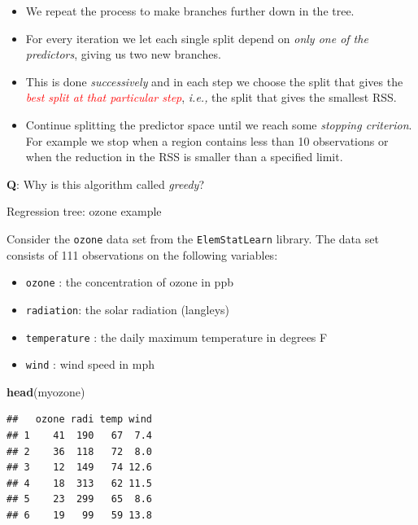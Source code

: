 \documentclass[10pt,ignorenonframetext,]{beamer}
\newenvironment{Shaded}{\begin{snugshade}}{\end{snugshade}}
\newcommand{\KeywordTok}[1]{\textcolor[rgb]{0.13,0.29,0.53}{\textbf{#1}}}
\newcommand{\NormalTok}[1]{#1}
\providecommand{\tightlist}{%
  \setlength{\itemsep}{0pt}\setlength{\parskip}{0pt}}
\begin{document}
\begin{frame}

\begin{itemize}
\item
  We repeat the process to make branches further down in the tree.
\item
  For every iteration we let each single split depend on \emph{only one
  of the predictors}, giving us two new branches.
\item
  This is done \emph{successively} and in each step we choose the split
  that gives the
  \emph{\textcolor{red}{best split at that particular step}},
  \emph{i.e.,} the split that gives the smallest RSS.
\item
  Continue splitting the predictor space until we reach some
  \emph{stopping criterion}. For example we stop when a region contains
  less than 10 observations or when the reduction in the RSS is smaller
  than a specified limit.
\end{itemize}

\vspace{1mm}

\textbf{Q}: Why is this algorithm called \emph{greedy}?

\end{frame}

\begin{frame}[fragile]

\begin{block}{Regression tree: ozone example}

\vspace{2mm}

Consider the \texttt{ozone} data set from the \texttt{ElemStatLearn}
library. The data set consists of 111 observations on the following
variables:

\begin{itemize}
\tightlist
\item
  \texttt{ozone} : the concentration of ozone in ppb
\item
  \texttt{radiation}: the solar radiation (langleys)
\item
  \texttt{temperature} : the daily maximum temperature in degrees F
\item
  \texttt{wind} : wind speed in mph
\end{itemize}

\begin{Shaded}
\begin{Highlighting}[]
\KeywordTok{head}\NormalTok{(myozone)}
\end{Highlighting}
\end{Shaded}

\begin{verbatim}
##   ozone radi temp wind
## 1    41  190   67  7.4
## 2    36  118   72  8.0
## 3    12  149   74 12.6
## 4    18  313   62 11.5
## 5    23  299   65  8.6
## 6    19   99   59 13.8
\end{verbatim}

\end{block}

\end{frame}
\end{document}
